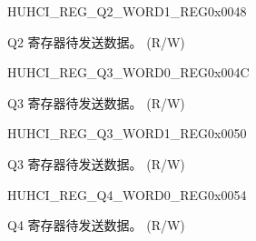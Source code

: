 \begin{register}{H}{UHCI\_REG\_Q2\_WORD1\_REG}{0x0048}\label{regdesc:UHCIREGQ2WORD1REG}
%
\regnewline%
\begin{regdesc}\begin{reglist}
\label{fielddesc:UHCISENDQ2WORD1}\item [UHCI\_SEND\_Q2\_WORD1] Q2 寄存器待发送数据。 (R/W)
\end{reglist}\end{regdesc}
\end{register}


\begin{register}{H}{UHCI\_REG\_Q3\_WORD0\_REG}{0x004C}\label{regdesc:UHCIREGQ3WORD0REG}
%
\regnewline%
\begin{regdesc}\begin{reglist}
\label{fielddesc:UHCISENDQ3WORD0}\item [UHCI\_SEND\_Q3\_WORD0] Q3 寄存器待发送数据。 (R/W)
\end{reglist}\end{regdesc}
\end{register}


\begin{register}{H}{UHCI\_REG\_Q3\_WORD1\_REG}{0x0050}\label{regdesc:UHCIREGQ3WORD1REG}
%
\regnewline%
\begin{regdesc}\begin{reglist}
\label{fielddesc:UHCISENDQ3WORD1}\item [UHCI\_SEND\_Q3\_WORD1] Q3 寄存器待发送数据。 (R/W)
\end{reglist}\end{regdesc}
\end{register}


\begin{register}{H}{UHCI\_REG\_Q4\_WORD0\_REG}{0x0054}\label{regdesc:UHCIREGQ4WORD0REG}
%
\regnewline%
\begin{regdesc}\begin{reglist}
\label{fielddesc:UHCISENDQ4WORD0}\item [UHCI\_SEND\_Q4\_WORD0] Q4 寄存器待发送数据。 (R/W)
\end{reglist}\end{regdesc}
\end{register}


